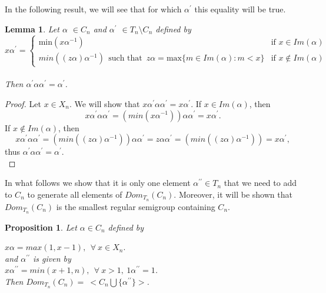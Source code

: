 \documentclass[10pt]{extarticle}
\numberwithin{equation}{section}
\numberwithin{bbb}{section}
\newtheorem{proposition}{Proposition}[section]
\newtheorem{lemma}{Lemma}[section]
\numberwithin{equation}{section}
\begin{document}
\vspace{0.8cm}
In the following result, we will see that for which $\alpha^{\prime}$ this equality will be true.
\vspace{0.1cm}
\begin{lemma}
Let $\alpha$ $\in C_n$ and $\alpha^{\prime}$ $\in T_n \setminus C_n$ defined by
 \begin{equation}
 \tag{4}
    x\alpha^{\prime}=
    \begin{cases}
    \text{min} (x\alpha^{-1}) & \text{if } x \in Im(\alpha)\\
    min((z\alpha)\alpha^{-1}) \ \ \text{such that} \,\, \, z\alpha=\text{max} \{m\in Im(\alpha) : m<x\}  & \text{if } x \notin Im(\alpha)
    \end{cases}
\end{equation}\\
Then $\alpha^{\prime}\alpha\alpha^{\prime}=\alpha^{\prime}$.
 \end{lemma}

\begin{proof}
    Let $x \in X_n$. We will show that $x\alpha^{\prime}\alpha\alpha^{\prime}=x\alpha^{\prime}$. If $x \in Im(\alpha)$, then $$x\alpha^{\prime}\alpha\alpha^{\prime} =(min(x\alpha^{-1}))\alpha\alpha^{\prime}=x\alpha^{\prime}.$$
    If $x \notin Im(\alpha)$, then   $$x\alpha^{\prime}\alpha\alpha^{\prime} =(min((z\alpha)\alpha^{-1}))\alpha\alpha^{\prime}= z\alpha\alpha^{\prime}=(min((z\alpha)\alpha^{-1}))=x\alpha^{\prime},$$
    thus $\alpha^{\prime}\alpha\alpha^{\prime}=\alpha^{\prime}$.\\
\end{proof}


In what follows we show that it is only one element $\alpha^{\prime\prime} \in T_n$ that we need to add to $C_n$ to generate all elements of $Dom_{T_{n}}(C_n)$. Moreover, it will be shown that $Dom_{T_{n}}(C_n)$ is the smallest regular semigroup containing $C_n$.

\vspace{0.2cm}
\begin{proposition} \label{pcn}
Let $\alpha \in C_n$ defined by 

\vspace{0.5cm}
\hspace{6cm} $x\alpha=max(1,x-1), \ \ \forall \ x\in X_n.$\\[10pt]
and $\alpha^{\prime\prime}$ is given by\\
\vspace{0.1cm}
\hspace{6cm} $x\alpha^{\prime\prime}=min(x+1,n), \ \ \forall \ x>1, \ 1\alpha^{\prime\prime}=1$.\\[10pt]
Then $Dom_{T_n}(C_n)= \ <C_n \bigcup \{{\alpha^{\prime\prime}}\}>$.
\end{proposition}
\end{document}
